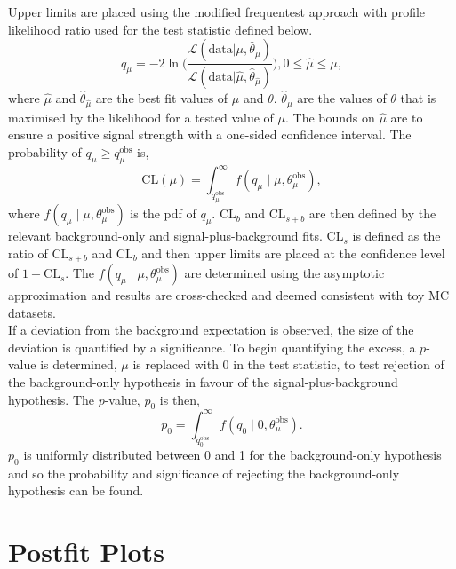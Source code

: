 Upper limits are placed using the modified frequentest approach \cite{} with profile likelihood ratio used for the test statistic defined below.
\begin{equation}
  q_{\mu} = -2 \ln \Biggl(\frac{\mathcal{L}(\text{data} | \mu, \hat{\theta}_{\mu})}{\mathcal{L}(\text{data} | \hat{\mu}, \hat{\theta}_{\hat{\mu}})}\Biggl), 0 \leq \hat{\mu} \leq \mu,
\end{equation}
where $\hat{\mu}$ and $\hat{\theta}_{\hat{\mu}}$ are the best fit values of $\mu$ and $\theta$. $\hat{\theta}_{\mu}$ are the values of $\theta$ that is maximised by the likelihood for a tested value of $\mu$.
The bounds on $\hat{\mu}$ are to ensure a positive signal strength with a one-sided confidence interval.
The probability of $q_{\mu} \geq q_{\mu}^{\text{obs}}$ is,
\begin{equation}
\text{CL}(\mu) = \int^{\infty}_{q_{\mu}^{\text{obs}}} f(q_{\mu} \mid \mu, \theta_{\mu}^{\text{obs}}),
\end{equation}
where $f(q_{\mu} \mid \mu, \theta_{\mu}^{\text{obs}})$ is the pdf of $q_\mu$.
$\text{CL}_{b}$ and $\text{CL}_{s+b}$ are then defined by the relevant background-only and signal-plus-background fits.
$\text{CL}_s$ is defined as the ratio of $\text{CL}_{s+b}$ and $\text{CL}_{b}$ and then upper limits are placed at the confidence level of $1-\text{CL}_{s}$.
The $f(q_{\mu} \mid \mu, \theta_{\mu}^{\text{obs}})$ are determined using the asymptotic approximation \cite{} and results are cross-checked and deemed consistent with toy MC datasets. \\

If a deviation from the background expectation is observed, the size of the deviation is quantified by a significance.
To begin quantifying the excess, a $p$-value is determined, $\mu$ is replaced with 0 in the test statistic, to test rejection of the background-only hypothesis in favour of the signal-plus-background hypothesis.
The $p$-value, $p_0$ is then,
\begin{equation}
p_{0} = \int^{\infty}_{q_{0}^{\text{obs}}} f(q_{0} \mid 0, \theta_{\mu}^{\text{obs}}).
\end{equation}
$p_{0}$ is uniformly distributed between 0 and 1 for the background-only hypothesis and so the probability and significance of rejecting the background-only hypothesis can be found. \\
 
\newpage
\section{Postfit Plots}

